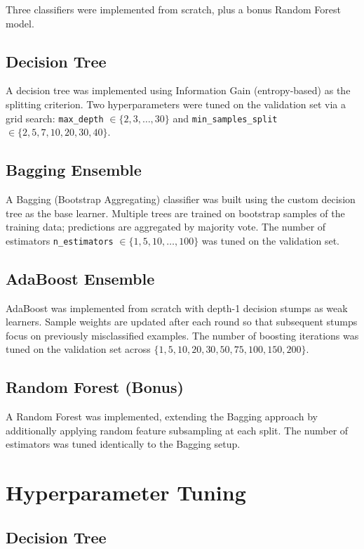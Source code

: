 \documentclass[12pt,a4paper]{article}
\begin{document}
Three classifiers were implemented from scratch, plus a bonus Random Forest model.

\subsection{Decision Tree}
A decision tree was implemented using Information Gain (entropy-based) as the splitting
criterion. Two hyperparameters were tuned on the validation set via a grid search:
\texttt{max\_depth} $\in \{2,3,\ldots,30\}$ and
\texttt{min\_samples\_split} $\in \{2,5,7,10,20,30,40\}$.

\subsection{Bagging Ensemble}
A Bagging (Bootstrap Aggregating) classifier was built using the custom decision tree as
the base learner. Multiple trees are trained on bootstrap samples of the training data;
predictions are aggregated by majority vote.
The number of estimators \texttt{n\_estimators} $\in \{1,5,10,\ldots,100\}$ was tuned on
the validation set.

\subsection{AdaBoost Ensemble}
AdaBoost was implemented from scratch with depth-1 decision stumps as weak learners.
Sample weights are updated after each round so that subsequent stumps focus on previously
misclassified examples. The number of boosting iterations was tuned on the validation set
across $\{1,5,10,20,30,50,75,100,150,200\}$.

\subsection{Random Forest (Bonus)}
A Random Forest was implemented, extending the Bagging approach by additionally applying
random feature subsampling at each split. The number of estimators was tuned identically
to the Bagging setup.

\section{Hyperparameter Tuning}

\subsection{Decision Tree}
\end{document}
